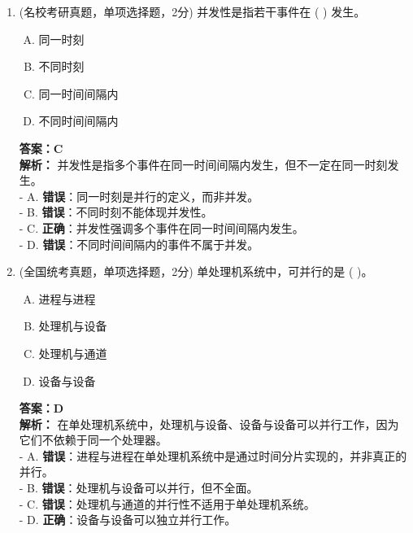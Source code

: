 \documentclass[lang=cn,newtx,10pt,scheme=chinese]{../../elegantbook}
\begin{document}
\begin{enumerate}
    \item (名校考研真题，单项选择题，2分) 并发性是指若干事件在 (    ) 发生。
    \begin{enumerate}[A.]
        \item 同一时刻
        \item 不同时刻
        \item 同一时间间隔内
        \item 不同时间间隔内
    \end{enumerate}
    \textbf{答案：C}\\
    \textbf{解析：} 并发性是指多个事件在同一时间间隔内发生，但不一定在同一时刻发生。\\
    - A. \textbf{错误}：同一时刻是并行的定义，而非并发。\\
    - B. \textbf{错误}：不同时刻不能体现并发性。\\
    - C. \textbf{正确}：并发性强调多个事件在同一时间间隔内发生。\\
    - D. \textbf{错误}：不同时间间隔内的事件不属于并发。\\

\item (全国统考真题，单项选择题，2分) 单处理机系统中，可并行的是 (    )。
    \begin{enumerate}[A.]
        \item 进程与进程
        \item 处理机与设备
        \item 处理机与通道
        \item 设备与设备
    \end{enumerate}
    \textbf{答案：D}\\
    \textbf{解析：} 在单处理机系统中，处理机与设备、设备与设备可以并行工作，因为它们不依赖于同一个处理器。\\
    - A. \textbf{错误}：进程与进程在单处理机系统中是通过时间分片实现的，并非真正的并行。\\
    - B. \textbf{错误}：处理机与设备可以并行，但不全面。\\
    - C. \textbf{错误}：处理机与通道的并行性不适用于单处理机系统。\\
    - D. \textbf{正确}：设备与设备可以独立并行工作。\\


\end{enumerate}
\end{document}
